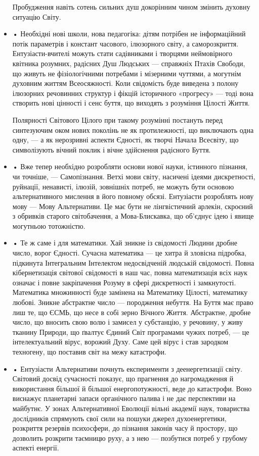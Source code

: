 \begin{itemize}
Пробудження навіть сотень сильних душ докорінним чином змінить
духовну ситуацію Світу.

\item • Необхідні нові школи, нова педагогіка: дітям потрібен не інформаційний
потік параметрів і констант часового, ілюзорного світу, а
саморозкриття. Ентузіасти-вчителі можуть стати садівниками і
творцями неймовірного квітника розумних, радісних Душ Людських
— справжніх Птахів Свободи, що живуть не фізіологічними
потребами і мізерними чуттями, а могутнім духовним життям
Всеосяжності. Коли свідомість буде виведена з полону ілюзорних
речовинних структур і фікцій історичного «прогресу» — тоді вона
створить нові цінності і сенс буття, що виходять з розуміння
Цілості Життя.

Полярності Світового Цілого при такому розумінні постануть перед синтезуючим
оком нових поколінь не як протилежності, що виключають одна
одну, — а як нерозривні аспекти Єдності, як творчі Начала
Всесвіту, що символізують вічний поклик і вічне здійснення
радісного Буття.

\item • Вже тепер необхідно розробляти основи нової науки, істинного пізнання,
чи точніше, — Самопізнання. Ветхі мови світу, насичені ідеями
дискретності, руйнації, ненависті, ілюзій, зовнішніх потреб, не
можуть бути основою альтернативного мислення в його повному
обсязі. Ентузіасти розроблять нову мову — Мову Альтернативи. Це
має бути не лінгвістичний арлекін, скроєний з обривків старого
світобачення, а Мова-Блискавка, що об’єднує ідею і явище
могутньою тотожністю.

\item • Те ж саме і для математики. Хай зникне із свідомості Людини дробне
число, ворог Єдності. Сучасна математика — це хитра й зловісна
підробка, підкинута Інтегральним Інтелектом недосвідченій
людській свідомості. Повна кібернетизація світової свідомості в
наш час, повна математизація всіх наук означає і повне
закріпачення Розуму в сфері дискретності і замкнутості.
Математика множинності буде замінена на Математику Цілості,
математику любові. Зникне абстрактне число — породження
небуття. На Буття має право лиш те, що ЄСМЬ, що несе в собі
зерно Вічного Життя. Абстрактне, дробне число, що вносить свою
волю і замисел у субстанцію, у речовину, у живу тканину
Природи, що ґвалтує Єдиний Світ програмами чужих потреб, — це
інтелектуальний вірус, ворожий Духу. Саме цей вірус і став
зародком техногену, що поставив світ на межу катастрофи.

\item • Ентузіасти Альтернативи почнуть експерименти з деенергетизації світу.
Світовий досвід сучасності показує, що прагнення до нагромадження й
використання більшої й більшої енергопотужності, веде до
катастрофи. Воно виснажує планетарні запаси органічного палива
і не дає перспективи на майбутнє. У зонах Альтернативної
Еволюції вільні академії наук, товариства дослідників спрямують
свої сили на пошуки джерел духоенергетики, розкриття резервів
психосфери, до пізнання законів часу й простору, що дозволить
розкрити таємницю руху, а з нею — позбутися потреб у грубому
аспекті енергії.


\end{itemize}

